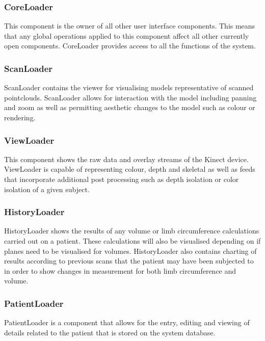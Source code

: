 \subsubsection{CoreLoader}

This component is the owner of all other user interface components. This means that any global operations applied to this component affect all other currently open components. CoreLoader provides access to all the functions of the system.

\subsubsection{ScanLoader}

ScanLoader contains the viewer for visualising models representative of scanned pointclouds. ScanLoader allows for interaction with the model including panning and zoom as well as permitting aesthetic changes to the model such as colour or rendering.

\subsubsection{ViewLoader}

This component shows the raw data and overlay streams of the Kinect device. ViewLoader is capable of representing colour, depth and skeletal as well as feeds that incorporate additional post processing such as depth isolation or color isolation of a given subject.

\subsubsection{HistoryLoader}

HistoryLoader shows the results of any volume or limb circumference calculations carried out on a patient. These calculations will also be visualised depending on if planes need to be visualised for volumes. HistoryLoader also contains charting of results according to previous scans that the patient may have been subjected to in order to show changes in measurement for both limb circumference and volume.

\subsubsection{PatientLoader}

PatientLoader is a component that allows for the entry, editing and viewing of details related to the patient that is stored on the system database. 

